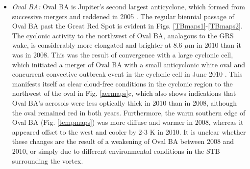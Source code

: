 \documentclass[final,5p,times,twocolumn,authoryear]{elsarticle}
\begin{document}
\begin{itemize}
\item \textit{Oval BA: } Oval BA is Jupiter's second largest anticyclone, which formed from successive mergers and reddened in 2005 \citep[e.g.,][]{08cheng}.  The regular biennial passage of Oval BA past the Great Red Spot is evident in Figs. \ref{TBmaps1}-\ref{TBmaps2}.  The cyclonic activity to the northwest of Oval BA, analagous to the GRS wake, is considerably more elongated and brighter at 8.6 $\mu$m in 2010 than it was in 2008.  This was the result of convergence with a large cyclonic cell, which initiated a merger of Oval BA with a small anticyclonic white oval and concurrent convective outbreak event in the cyclonic cell in June 2010 \citep[described in detail by][]{10rogers_BA}.   This manifests itself as clear cloud-free conditions in the cyclonic region to the northwest of the oval in Fig. \ref{aermaps}c, which also shows indications that Oval BA's aerosols were less optically thick in 2010 than in 2008, although the oval remained red in both years.  Furthermore, the warm southern edge of Oval BA (Fig. \ref{tempmaps}) was more diffuse and warmer in 2008, whereas it appeared offset to the west and cooler by 2-3 K in 2010.  It is unclear whether these changes are the result of a weakening of Oval BA between 2008 and 2010, or simply due to different environmental conditions in the STB surrounding the vortex.



\end{itemize}
\end{document}
